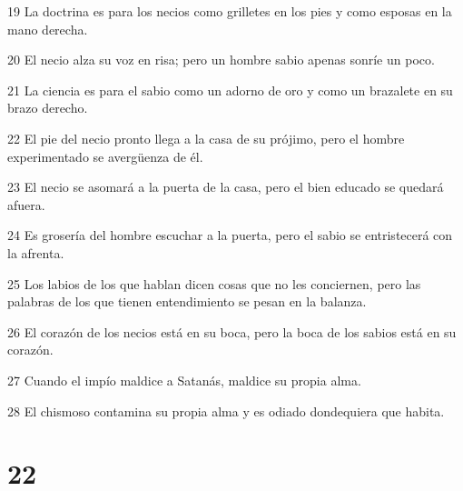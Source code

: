 \par 19 La doctrina es para los necios como grilletes en los pies y como esposas en la mano derecha.
\par 20 El necio alza su voz en risa; pero un hombre sabio apenas sonríe un poco.
\par 21 La ciencia es para el sabio como un adorno de oro y como un brazalete en su brazo derecho.
\par 22 El pie del necio pronto llega a la casa de su prójimo, pero el hombre experimentado se avergüenza de él.
\par 23 El necio se asomará a la puerta de la casa, pero el bien educado se quedará afuera.
\par 24 Es grosería del hombre escuchar a la puerta, pero el sabio se entristecerá con la afrenta.
\par 25 Los labios de los que hablan dicen cosas que no les conciernen, pero las palabras de los que tienen entendimiento se pesan en la balanza.
\par 26 El corazón de los necios está en su boca, pero la boca de los sabios está en su corazón.
\par 27 Cuando el impío maldice a Satanás, maldice su propia alma.
\par 28 El chismoso contamina su propia alma y es odiado dondequiera que habita.

\chapter{22}

